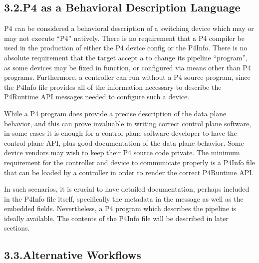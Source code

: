 \documentclass[11pt]{article}
\begin{document}
{%
\subsection{3.2.\hspace*{0.5em}P4 as a Behavioral Description Language}\label{sec-p4-as-behavioral-description-language}%

\noindent{}P4 can be considered a behavioral description of a switching device which may or
may not execute \textquotedblleft{}P4\textquotedblright{} natively. There is no requirement that a P4 compiler be
used in the production of either the P4 device config or the P4Info. There is no
absolute requirement that the target accept a  to
change its pipeline \textquotedblleft{}program\textquotedblright{}, as some devices may be fixed in function, or
configured via means other than P4 programs. Furthermore, a controller can run
without a P4 source program, since the P4Info file provides all of the
information necessary to describe the P4Runtime API messages needed to configure
such a device.%

While a P4 program does provide a precise description of the data plane
behavior, and this can prove invaluable in writing correct control plane
software, in some cases it is enough for a control plane software developer to
have the control plane API, plus good documentation of the data plane
behavior. Some device vendors may wish to keep their P4 source code private. The
minimum requirement for the controller and device to communicate properly is a
P4Info file that can be loaded by a controller in order to render the correct
P4Runtime API.%

In such scenarios, it is crucial to have detailed documentation, perhaps
included in the P4Info file itself, specifically the metadata in the 
message as well as the embedded  fields. Nevertheless, a P4 program which
describes the pipeline is ideally available. The contents of the P4Info file
will be described in later sections.%

\subsection{3.3.\hspace*{0.5em}Alternative Workflows}\label{sec-alternative-workflows}%

}
\end{document}
